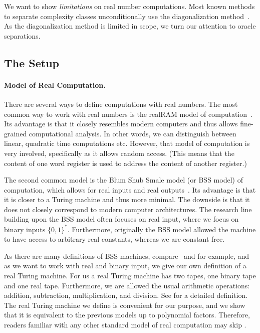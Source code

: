 \documentclass{article}
\begin{document}
    We want to show \textit{limitations} 
    on real number computations.
    Most known methods to separate complexity classes unconditionally use the diagonalization method~\cite{arora2009computational}. 
    As the diagonalization method is limited in scope, 
    we turn our attention to oracle separations.

\subsection{The Setup}
    \paragraph{Model of Real Computation.}
    There are several ways to define computations with real numbers.
    The most common way to work with real numbers is the realRAM model
    of computation~\cite{EvdHM20}.
    Its advantage is that it closely resembles modern computers and 
    thus allows fine-grained computational analysis.
    In other words, we can distinguish between linear, quadratic time computations etc.
    However, that model of computation is very involved, specifically as it allows random access.
    (This means that the content of one word register is used to address the content of another register.)

    The second common model is the Blum Shub Smale model (or BSS model) of computation, which allows for real inputs 
    and real outputs~\cite{BSS89, BSS97}. 
    Its advantage is that it is closer to a Turing machine and thus more minimal.
    The downside is that it does not closely correspond to modern computer architectures.
    The research line building upon the BSS model often focuses on real input, where we focus on binary inputs $\{0,1\}^*$.
    Furthermore, originally the BSS model allowed the machine to have access to arbitrary real constants, whereas we are constant free.
    
    As there are many definitions of BSS machines, compare~\cite{BSS89} and \cite{BSS97} for example, and as we want to work with real and binary input, we give our own definition of a real Turing machine.
    For us a real Turing machine has two tapes, one binary tape and one real tape. 
    Furthermore, we are allowed the usual arithmetic operations: addition, subtraction, multiplication, and division.
    See  for a detailed definition.
    The real Turing machine we define is convenient for our purpose, and we show that it is equivalent to the previous models up to polynomial factors. 
    Therefore, readers familiar with any other standard model of real computation may skip .
    
\end{document}
